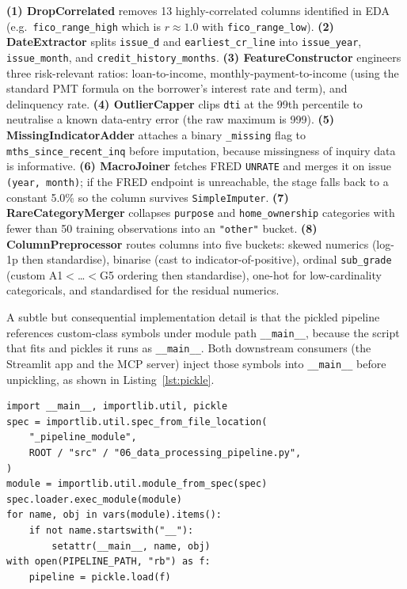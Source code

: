 \documentclass[conference]{IEEEtran}
\begin{document}
\noindent \textbf{(1) DropCorrelated} removes 13 highly-correlated columns
identified in EDA (e.g.\ \texttt{fico\_range\_high} which is $r \approx 1.0$
with \texttt{fico\_range\_low}). \textbf{(2) DateExtractor} splits
\texttt{issue\_d} and \texttt{earliest\_cr\_line} into \texttt{issue\_year},
\texttt{issue\_month}, and \texttt{credit\_history\_months}.
\textbf{(3) FeatureConstructor} engineers three risk-relevant ratios:
loan-to-income, monthly-payment-to-income (using the standard PMT formula
on the borrower's interest rate and term), and delinquency rate.
\textbf{(4) OutlierCapper} clips \texttt{dti} at the 99th percentile to
neutralise a known data-entry error (the raw maximum is 999).
\textbf{(5) MissingIndicatorAdder} attaches a binary \texttt{\_missing} flag
to \texttt{mths\_since\_recent\_inq} before imputation, because missingness
of inquiry data is informative. \textbf{(6) MacroJoiner} fetches FRED
\texttt{UNRATE} and merges it on issue \texttt{(year, month)}; if the FRED
endpoint is unreachable, the stage falls back to a constant 5.0\% so the
column survives \texttt{SimpleImputer}. \textbf{(7) RareCategoryMerger}
collapses \texttt{purpose} and \texttt{home\_ownership} categories with
fewer than 50 training observations into an \texttt{"other"} bucket.
\textbf{(8) ColumnPreprocessor} routes columns into five buckets: skewed
numerics (log-1p then standardise), binarise (cast to indicator-of-positive),
ordinal \texttt{sub\_grade} (custom A1$<$\dots$<$G5 ordering then
standardise), one-hot for low-cardinality categoricals, and standardised for
the residual numerics.

A subtle but consequential implementation detail is that the pickled
pipeline references custom-class symbols under module path \texttt{\_\_main\_\_},
because the script that fits and pickles it runs as \texttt{\_\_main\_\_}.
Both downstream consumers (the Streamlit app and the MCP server) inject
those symbols into \texttt{\_\_main\_\_} before unpickling, as shown in
Listing~\ref{lst:pickle}.

\begin{lstlisting}[caption={Pickle-time symbol injection used by every consumer of \texttt{preprocessing\_pipeline.pkl}.},label={lst:pickle}]
import __main__, importlib.util, pickle
spec = importlib.util.spec_from_file_location(
    "_pipeline_module",
    ROOT / "src" / "06_data_processing_pipeline.py",
)
module = importlib.util.module_from_spec(spec)
spec.loader.exec_module(module)
for name, obj in vars(module).items():
    if not name.startswith("__"):
        setattr(__main__, name, obj)
with open(PIPELINE_PATH, "rb") as f:
    pipeline = pickle.load(f)
\end{lstlisting}
\end{document}

